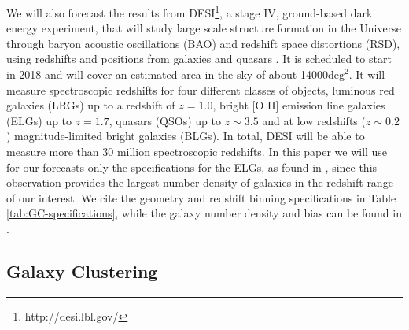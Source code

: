 We will also forecast the results from DESI\footnote{http://desi.lbl.gov/}, a stage IV, ground-based dark energy experiment, that will study large scale structure formation in the Universe through baryon acoustic oscillations (BAO) and redshift space distortions (RSD), using redshifts and positions from galaxies and quasars \cite{desi_collaboration_desi_2016-1,desi_collaboration_desi_2016,levi_desi_2013}.
It is scheduled to start in 2018 
and will cover an estimated area in the sky of about 
14000$\text{deg}^2$. It will measure spectroscopic redshifts for four different classes of objects, luminous red galaxies (LRGs) up to a redshift of $z=1.0$, bright [O II] emission line galaxies (ELGs) up to $z=1.7$, quasars (QSOs) up to $z\sim3.5$ and at low redshifts ($z\sim0.2$) magnitude-limited bright galaxies (BLGs). In total, 
DESI will be able to measure more than 30 million spectroscopic redshifts.
In this paper we will use for our forecasts only the specifications for the ELGs, as found in \cite{desi_collaboration_desi_2016-1}, since this observation provides the largest number density of galaxies in the redshift range of our interest. We cite the geometry and redshift binning specifications in Table \ref{tab:GC-specifications}, while the galaxy number density and bias can be found in \cite{desi_collaboration_desi_2016-1}.







\subsection{Galaxy Clustering\label{sub:Fisher-Galaxy-Clustering}}

